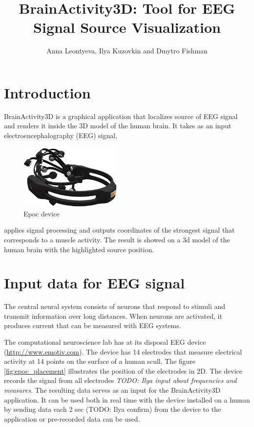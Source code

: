 \documentclass[]{article}   %
\title{BrainActivity3D: Tool for EEG Signal Source Visualization}   %
\author{Anna Leontyeva, Ilya Kuzovkin and Dmytro Fishman}
\affil{University of Tartu, Institute of Computer Science}
\begin{document}

\maketitle
     
\section{Introduction}
BrainActivity3D is a graphical application that localizes source of EEG signal and renders it inside the 3D model of the human brain. It takes as an input electroencephalography (EEG) signal, 
\begin{figure}
 \centering
 \vspace{-8pt}
 \includegraphics[width=0.45\textwidth]{../Images/emotiv.jpg}
 \caption{Epoc device}
 \label{fig:summation_of_postsynaptic_potentials}
 \vspace{-40pt}
\end{figure}
applies signal processing and outputs coordinates of the strongest signal that corresponds to a muscle activity. The result is showed on a 3d model of the human brain with the highlighted source position.         


\section{Input data for EEG signal}
The central neural system consists of neurons that respond to stimuli and transmit information over long distances. When  neurons are activated, it produces current that can be measured with EEG systems.
 
The computational neuroscience lab has at its disposal EEG device (\url{http://www.emotiv.com}). The device has 14 electrodes that measure electrical activity at 14 points on the surface of a human scull. The figure \ref{fig:epoc_placement} illustrates the position of the electrodes in 2D. 
The device records the signal from all electrodes  \emph{TODO: Ilya input about frequencies and measures}.
The resulting data serves as an input for the BrainActivity3D application. It can be used both in real time with the device installed on a human by sending data each 2 sec (TODO: Ilya confirm) from the device to the application or pre-recorded data can be used.
  
\end{document}

